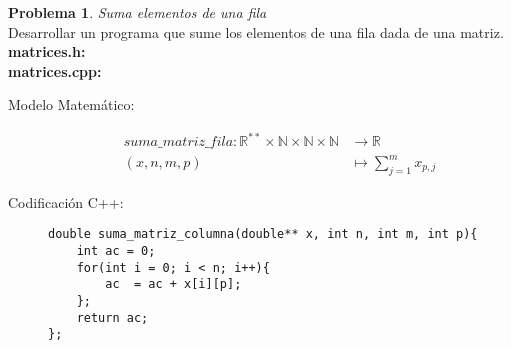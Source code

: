 \documentclass{article}
\theoremstyle{plain}
\theoremstyle{definition}
\newtheorem{problem}{Problema}
\begin{document}
\begin{problem} \emph{Suma elementos de una fila}\\
Desarrollar un programa que sume los elementos de una fila dada de una matriz.\\
\textbf{matrices.h:}\ \\
\textbf{matrices.cpp:}\ 
%
\begin{description}
\item[Modelo Matemático:]
%
\begin{align*}
suma\_matriz\_fila: \mathbb{R}^{**}\times\mathbb{N}\times\mathbb{N}\times\mathbb{N} &\to \mathbb{R}\\
(x,n,m,p) &\mapsto \sum_{j=1}^{m} x_{p,j}
\end{align*}
%
\item[Codificación \textsf{C++}:]\hfill
%
\begin{verbatim}
double suma_matriz_columna(double** x, int n, int m, int p){
    int ac = 0;
    for(int i = 0; i < n; i++){
        ac  = ac + x[i][p];
    };
    return ac;
};
\end{verbatim}
\end{description}
\end{problem}
\end{document}
